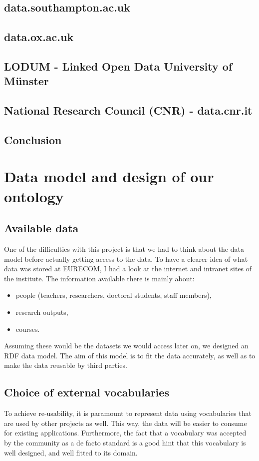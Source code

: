 \documentclass[a4paper,11pt]{report}
\begin{document}
\section*{data.southampton.ac.uk}
\section*{data.ox.ac.uk}
\section*{LODUM - Linked Open Data University of Münster}
\section*{National Research Council (CNR) - data.cnr.it}
\section*{Conclusion}



\chapter{Data model and design of our ontology}
\section{Available data}
One of the difficulties with this project is that we had to think about the data model before actually getting access to the data. To have a clearer idea of what data was stored at EURECOM, I had a look at the internet and intranet sites of the institute. The information available there is mainly about: 
\begin{itemize}
\item people (teachers, researchers, doctoral students, staff members), 
\item research outputs, 
\item courses. 
\end{itemize}
Assuming these would be the datasets we would access later on, we designed an RDF data model. The aim of this model is to fit the data accurately, as well as to make the data reusable by third parties. 
 
\section{Choice of external vocabularies}
To achieve re-usability, it is paramount to represent data using vocabularies that are used by other projects as well. This way, the data will be easier to consume for existing applications. Furthermore, the fact that a vocabulary was accepted by the community as a de facto standard is a good hint that this vocabulary is well designed, and well fitted to its domain. 
\end{document}
